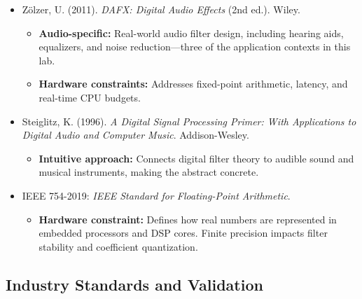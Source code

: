\documentclass[11pt,letterpaper]{article}
\begin{document}
\begin{itemize}
    \item Zölzer, U. (2011). \textit{DAFX: Digital Audio Effects} (2nd ed.). Wiley.
    \begin{itemize}
        \item \textbf{Audio-specific:} Real-world audio filter design, including hearing aids, equalizers, and noise reduction—three of the application contexts in this lab.
        \item \textbf{Hardware constraints:} Addresses fixed-point arithmetic, latency, and real-time CPU budgets.
    \end{itemize}

    \item Steiglitz, K. (1996). \textit{A Digital Signal Processing Primer: With Applications to Digital Audio and Computer Music}. Addison-Wesley.
    \begin{itemize}
        \item \textbf{Intuitive approach:} Connects digital filter theory to audible sound and musical instruments, making the abstract concrete.
    \end{itemize}

    \item IEEE 754-2019: \textit{IEEE Standard for Floating-Point Arithmetic}.
    \begin{itemize}
        \item \textbf{Hardware constraint:} Defines how real numbers are represented in embedded processors and DSP cores. Finite precision impacts filter stability and coefficient quantization.
    \end{itemize}
\end{itemize}

\subsection*{Industry Standards and Validation}
\end{document}
